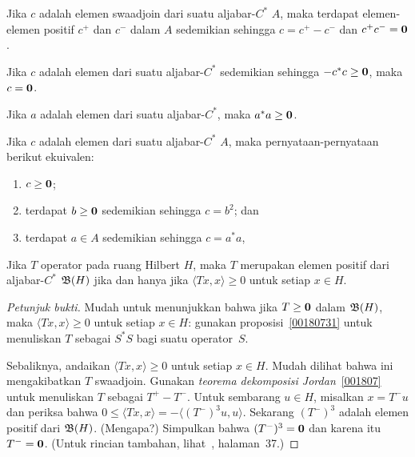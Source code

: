 \begin{thm}\label{001807} Jika $c$ adalah elemen swaadjoin dari suatu
aljabar-$C^*$ $A$, maka terdapat elemen-elemen positif
$c^+$ dan $c^-$ dalam $A$ sedemikian sehingga $c = c^+ - c^-$ dan $c^+c^- = \mathbf{0}$.
\end{thm}

\begin{lem} Jika $c$ adalah elemen dari suatu aljabar-$C^*$ sedemikian sehingga $-c^*c \ge \mathbf{0}$, maka $c
= \mathbf{0}$.
\end{lem}

\begin{prop} Jika $a$ adalah elemen dari suatu aljabar-$C^*$, maka $a^*a \ge \mathbf{0}$.
\end{prop}

\begin{prop}\label{00180731} Jika $c$ adalah elemen dari suatu aljabar-$C^*$ $A$, maka pernyataan-pernyataan
berikut ekuivalen:
 \begin{enumerate}
    \item[(i)] $c \ge \mathbf{0}$;
    \item[(ii)] terdapat $b \ge \mathbf{0}$ sedemikian sehingga $c = b^2$; dan
    \item[(iii)] terdapat $a \in A$ sedemikian sehingga $c = a^*a$,
 \end{enumerate}
\end{prop}

\begin{exam}\label{00180741} Jika $T$ operator pada ruang Hilbert $H$, maka $T$ merupakan
elemen positif dari aljabar-$C^*$ $\mathfrak{B}(H)$ jika dan hanya jika $\langle Tx,x \rangle
\ge 0$ untuk setiap $x \in H$.
\end{exam}

\begin{proof}[\emph{Petunjuk bukti}] Mudah untuk menunjukkan bahwa jika $T \ge \mathbf{0}$ dalam $\mathfrak{B}(H)$, maka
$\langle Tx,x \rangle \ge 0$ untuk setiap $x \in H$: gunakan proposisi~\ref{00180731} untuk
menuliskan $T$ sebagai $S^*S$ bagi suatu operator~$S$.

Sebaliknya, andaikan $\langle Tx,x \rangle \ge 0$ untuk setiap $x \in H$. Mudah
dilihat bahwa ini mengakibatkan $T$ swaadjoin. Gunakan \emph{teorema dekomposisi
Jordan}~\ref{001807} untuk menuliskan $T$ sebagai $T^+ - T^-$. Untuk sembarang $u \in H$, misalkan $x = T^-u$
dan periksa bahwa $0 \le \langle Tx,x \rangle = -\langle (T^-)^3u,u \rangle$. Sekarang $(T^-)^3$
adalah elemen positif dari $\mathfrak{B}(H)$. (Mengapa?) Simpulkan bahwa $(T^-)^3 = \mathbf{0}$ dan
karena itu $T^- = \mathbf{0}$. (Untuk rincian tambahan, lihat~\cite{DoranB:1986}, halaman~37.) \ns
\end{proof}

